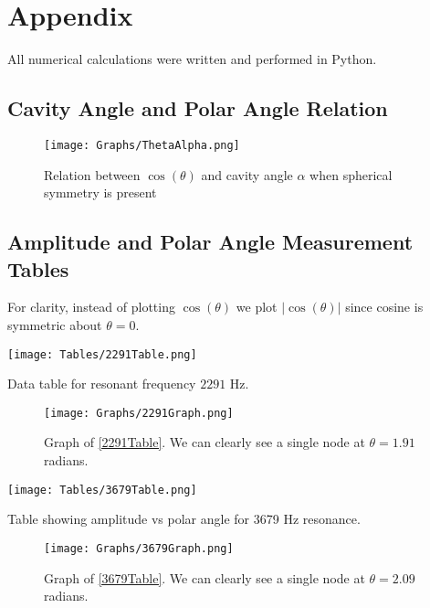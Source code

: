 

\section{Appendix}
\label{AppendixA}

All numerical calculations were written and performed in Python.

\subsection{Cavity Angle and Polar Angle Relation}

\begin{figure}[H]
	\centering
	\captionsetup{justification = raggedright}
	\texttt{[image: Graphs/ThetaAlpha.png]}
	\caption{Relation between $\cos(\theta)$ and cavity angle $\alpha$ when spherical symmetry is present}
	\label{ThetaAlpha}
\end{figure}


\subsection{Amplitude and Polar Angle Measurement Tables}
For clarity, instead of plotting $\cos(\theta)$ we plot $|\cos(\theta)|$ since cosine is symmetric about $\theta = 0$.

\begin{multicols}{2}
	\begin{table}[H]
		\texttt{[image: Tables/2291Table.png]}
		\caption{Data table for resonant frequency $2291$ Hz.}
		\label{2291Table}		
	\end{table} 
	\columnbreak
	\begin{figure}[H]
		\texttt{[image: Graphs/2291Graph.png]}
		\caption{Graph of \cref{2291Table}. We can clearly see a single node at $\theta = 1.91$ radians.}
		\label{2291Graph}
	\end{figure}
\end{multicols}

\pagebreak

\begin{multicols}{2}
	\begin{table}[H]
		\texttt{[image: Tables/3679Table.png]}
		\caption{Table showing amplitude vs polar angle for 3679 Hz resonance.}
		\label{3679Table}		
	\end{table} 
	\columnbreak
	\begin{figure}[H]
		\texttt{[image: Graphs/3679Graph.png]}
		\caption{Graph of \cref{3679Table}. We can clearly see a single node at $\theta = 2.09$ radians.}
		\label{3679Graph}
	\end{figure}
\end{multicols}



